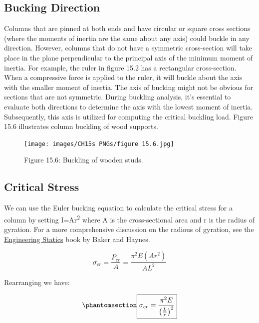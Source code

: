 \documentclass[
  letterpaper,
  DIV=11,
  numbers=noendperiod]{scrreprt}
\theoremstyle{definition}
\theoremstyle{remark}
\begin{document}
\subsection{Bucking Direction}\label{bucking-direction}

Columns that are pinned at both ends and have circular or square cross
sections (where the moments of inertia are the same about any axis)
could buckle in any direction. However, columns that do not have a
symmetric cross-section will take place in the plane perpendicular to
the principal axis of the minimum moment of inertia. For example, the
ruler in figure 15.2 has a rectangular cross-section. When a compressive
force is applied to the ruler, it will buckle about the axis with the
smaller moment of inertia. The axis of bucking might not be obvious for
sections that are not symmetric. During buckling analysis, it's
essential to evaluate both directions to determine the axis with the
lowest moment of inertia. Subsequently, this axis is utilized for
computing the critical buckling load. Figure 15.6 illustrates column
buckling of wood supports.

\begin{figure}[H]

{\centering \texttt{[image: images/CH15s PNGs/figure 15.6.jpg]}

}

\caption{Figure 15.6: Buckling of wooden studs.}

\end{figure}%

\subsection{Critical Stress}\label{critical-stress}

We can use the Euler bucking equation to calculate the critical stress
for a column by setting I=Ar\textsuperscript{2} where A is the
cross-sectional area and r is the radius of gyration. For a more
comprehensive discussion on the radious of gyration, see the
\href{https://engineeringstatics.org/radius-of-gyration-sec.html}{Engineering
Statics} book by Baker and Haynes.

\[
\sigma_{c r}=\frac{P_{c r}}{A}=\frac{\pi^2 E\left(A r^2\right)}{A L^2}
\]

Rearranging we have:

\begin{equation}\phantomsection\label{eq-15.2}{
\boxed{\sigma_{c r}=\frac{\pi^2 E}{\left(\frac{L}{r}\right)^2}}
}\end{equation}
\end{document}
